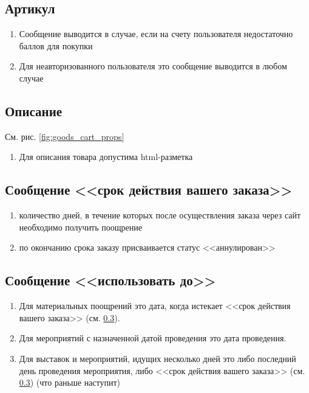             
        \subsection{Артикул}
            \begin{enumerate}
                \item Сообщение выводится в случае, если на счету 
                пользователя недостаточно баллов для покупки 
                \item Для неавторизованного пользователя это сообщение 
                выводится в любом случае
            \end{enumerate}

        \subsection{Описание}
            См. рис. \ref{fig:goods_cart_props}
            \begin{enumerate}
                \item Для описания товара допустима html-разметка
            \end{enumerate}

        \subsection{Сообщение <<срок действия вашего заказа>>}
            \label{sec:goods_expires}
            \begin{enumerate}
                \item количество дней, в течение которых после осуществления 
                заказа через сайт необходимо получить поощрение
                \item по окончанию срока заказу присваивается статус 
                <<аннулирован>>
            \end{enumerate}
        
        \subsection{Сообщение <<использовать до>>}
            \begin{enumerate}
                \item Для материальных поощрений это дата, когда истекает 
                <<срок действия вашего заказа>> (см. \ref{sec:goods_expires}).
                \item Для мероприятий с назначенной датой проведения это 
                дата проведения.
                \item Для выставок и мероприятий, идущих несколько дней это 
                либо последний день проведения мероприятия, 
                    либо <<срок действия вашего заказа>> (см. 
                    \ref{sec:goods_expires}) (что раньше наступит)
            \end{enumerate}
            
